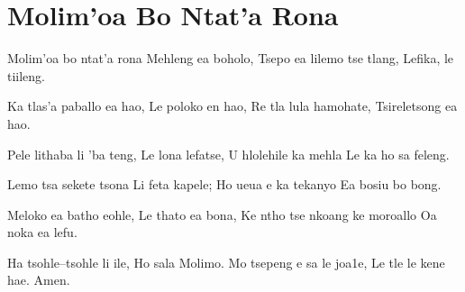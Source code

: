\starttocol
\chapter{Molim'oa Bo Ntat'a Rona}
\nexttocol
\hfill{\it }
\stoptocol
\starttocol
\startlines
{\sc Molim}'oa bo ntat'a rona
Mehleng ea boholo,
Tsepo ea lilemo tse tlang,
Lefika, le tiileng.

Ka tlas'a paballo ea hao,
Le poloko en hao,
Re tla lula hamohate,
Tsireletsong ea hao.

Pele lithaba li 'ba teng,
Le lona lefatse,
U hlolehile ka mehla
Le ka ho sa feleng. 

Lemo tsa sekete tsona
Li feta kapele; 
Ho ueua e ka tekanyo  
Ea bosiu bo bong. 

Meloko ea batho eohle, 
Le thato ea bona, 
Ke ntho tse nkoang ke moroallo
Oa noka ea lefu.

Ha tsohle--tsohle li ile,
Ho sala Molimo. 
Mo tsepeng e sa le joa1e, 
Le tle le kene hae. 
          \hfill Amen.~~~~~~~~~
\stoplines
\nexttocol

\stoptocol
